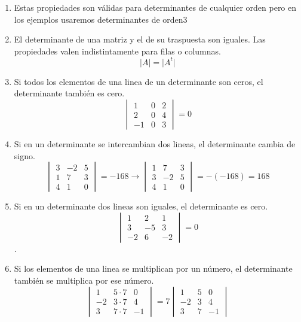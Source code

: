 \begin{enumerate}
\item Estas propiedades son válidas para determinantes de cualquier orden pero en los ejemplos usaremos determinantes de orden$3$

\item El determinante de una matriz y el de su traspuesta son iguales. Las propiedades valen indistintamente para filas o columnas.
\[ \vert A \vert =\vert A^t \vert \]

\item Si todos los elementos de una linea de un determinante son ceros, el determinante también es cero.
\[ \begin{vmatrix}
1&0&2\\
2&0&4\\
-1&0&3
\end{vmatrix}=0 \]

\item Si en un determinante se intercambian dos lineas, el determinante cambia de signo.
\[ \begin{vmatrix}
3&-2&5\\
1&7&3\\
4&1&0
\end{vmatrix}=-168\longrightarrow \begin{vmatrix}
1&7&3\\
3&-2&5\\
4&1&0
\end{vmatrix}=-(-168)=168 \]

\item Si en un determinante dos lineas son iguales, el determinante es cero.
\[ \begin{vmatrix}
1&2&1\\
3&-5&3\\
-2&6&-2
\end{vmatrix}=0 \].

\item Si los elementos de una linea se multiplican por un número, el determinante también se multiplica por ese número.
\[ \begin{vmatrix}
1&5\cdot 7&0\\
-2&3\cdot 7 &4\\
3&7\cdot 7& -1
\end{vmatrix}=7\begin{vmatrix}
1&5&0\\
-2&3 &4\\
3&7& -1
\end{vmatrix} \]


\end{enumerate}
